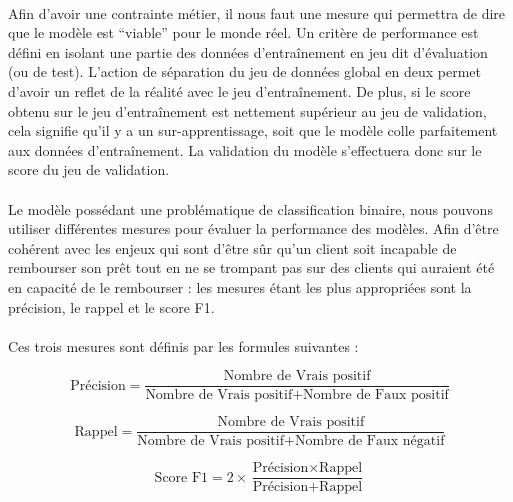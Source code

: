 \documentclass[10pt, french, a4paper]{report}
\begin{document}
\paragraph{}
Afin d'avoir une contrainte métier, il nous faut une mesure qui permettra de dire que le modèle est ``viable'' pour le monde réel. Un critère de performance est défini en isolant une partie des données d'entraînement en jeu dit d'évaluation (ou de test). L'action de séparation du jeu de données global en deux permet d'avoir un reflet de la réalité avec le jeu d'entraînement. De plus, si le score obtenu sur le jeu d'entraînement est nettement supérieur au jeu de validation, cela signifie qu'il y a un sur-apprentissage, soit que le modèle colle parfaitement aux données d'entraînement. La validation du modèle s'effectuera donc sur le score du jeu de validation.

\paragraph{}
Le modèle possédant une problématique de classification binaire, nous pouvons utiliser différentes mesures pour évaluer la performance des modèles. Afin d'être cohérent avec les enjeux qui sont d'être sûr qu'un client soit incapable de rembourser son prêt tout en ne se trompant pas sur des clients qui auraient été en capacité de le rembourser : les mesures étant les plus appropriées sont la précision, le rappel et le score F1.

\paragraph{}
Ces trois mesures sont définis par les formules suivantes :

\begin{equation}
  \text{Précision} = \frac{\text{Nombre de Vrais positif}}{\text{Nombre de Vrais positif} + \text{Nombre de Faux positif}}
\end{equation}

\begin{equation}
  \text{Rappel} = \frac{\text{Nombre de Vrais positif}}{\text{Nombre de Vrais positif} + \text{Nombre de Faux négatif}}
\end{equation}

\begin{equation}
  \text{Score F1} = 2 \times \frac{\text{Précision} \times \text{Rappel}}{\text{Précision}+\text{Rappel}}
\end{equation}
\end{document}

